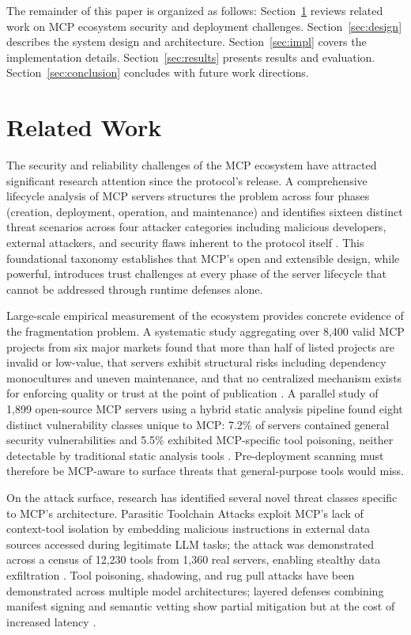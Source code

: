 \documentclass[conference]{IEEEtran}
\begin{document}
The remainder of this paper is organized as follows:
Section~\ref{sec:related} reviews related work on MCP ecosystem security
and deployment challenges.
Section~\ref{sec:design} describes the system design and architecture.
Section~\ref{sec:impl} covers the implementation details.
Section~\ref{sec:results} presents results and evaluation.
Section~\ref{sec:conclusion} concludes with future work directions.

\section{Related Work}
\label{sec:related}

The security and reliability challenges of the MCP ecosystem have
attracted significant research attention since the protocol's release.
A comprehensive lifecycle analysis of MCP servers structures the problem
across four phases (creation, deployment, operation, and maintenance)
and identifies sixteen distinct threat scenarios across four attacker
categories including malicious developers, external attackers, and
security flaws inherent to the protocol itself \cite{jamshidi2025}.
This foundational taxonomy establishes that MCP's open and extensible
design, while powerful, introduces trust challenges at every phase of
the server lifecycle that cannot be addressed through runtime defenses
alone.

Large-scale empirical measurement of the ecosystem provides concrete
evidence of the fragmentation problem.
A systematic study aggregating over 8,400 valid MCP projects from six
major markets found that more than half of listed projects are invalid
or low-value, that servers exhibit structural risks including dependency
monocultures and uneven maintenance, and that no centralized mechanism
exists for enforcing quality or trust at the point of
publication \cite{guo2025}.
A parallel study of 1,899 open-source MCP servers using a hybrid static
analysis pipeline found eight distinct vulnerability classes unique to
MCP: 7.2\% of servers contained general security vulnerabilities and
5.5\% exhibited MCP-specific tool poisoning, neither detectable by
traditional static analysis tools \cite{hasan2025}.
Pre-deployment scanning must therefore be MCP-aware to surface threats
that general-purpose tools would miss.

On the attack surface, research has identified several novel threat
classes specific to MCP's architecture.
Parasitic Toolchain Attacks exploit MCP's lack of context-tool isolation
by embedding malicious instructions in external data sources accessed
during legitimate LLM tasks; the attack was demonstrated across a census
of 12,230 tools from 1,360 real servers, enabling stealthy data
exfiltration \cite{zhao2025}.
Tool poisoning, shadowing, and rug pull attacks have been demonstrated
across multiple model architectures; layered defenses combining manifest
signing and semantic vetting show partial mitigation but at the cost of
increased latency \cite{jamshidi2025}.
\end{document}
